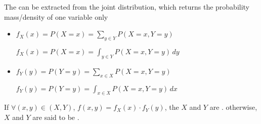 \begin{definition}
    The  can be extracted from the joint distribution, which returns the probability mass/density of one variable only

    \begin{itemize}
        \item $f_X(x) = P(X = x) = \sum_{y \in Y} P(X = x, Y = y)$

              $f_X(x) = P(X = x) = \int_{y \in Y} P(X = x, Y = y) \,dy$

        \item $f_Y(y) = P(Y = y) = \sum_{x \in X} P(X = x, Y = y)$

              $f_Y(y) = P(Y = y) = \int_{x \in X} P(X = x, Y = y) \,dx$
    \end{itemize}

    If $\forall (x, y) \in (X, Y)$, $f(x, y) = f_X(x) \cdot f_Y(y)$, the $X$ and $Y$ are . otherwise, $X$ and $Y$ are said to be . 
\end{definition}